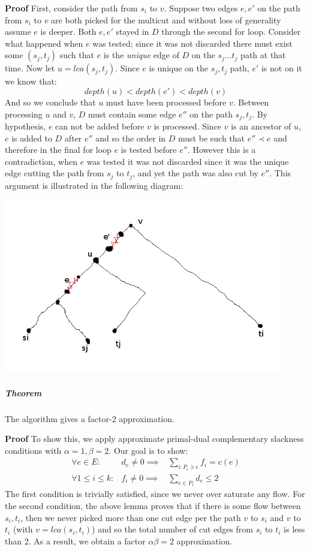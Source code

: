 \documentclass{article}
\begin{document}
\textbf{Proof} First, consider the path from $s_i$ to $v$.  Suppose two edges $e, e'$ on the path from $s_i$ to $v$ are both picked for the multicut and without loss of generality assume $e$ is deeper.  Both $e, e'$ stayed in $D$ through the second for loop.  Consider what happened when $e$ was tested; since it was not discarded there must exist some $(s_j, t_j)$ such that $e$ is the \emph{unique} edge of $D$ on the $s_j ... t_j$ path at that time.  Now let $u = lca(s_j, t_j)$.  Since $e$ is unique on the $s_j, t_j$ path, $e'$ is not on it we know that:
\[ depth(u) < depth(e') < depth(v) \]
And so we conclude that $u$ must have been processed before $v$.  Between processing $u$ and $v$, $D$ must contain some edge $e''$ on the path $s_j, t_j$.  By hypothesis, $e$ can not be added before $v$ is processed.  Since $v$ is an ancestor of $u$, $e$ is added to $D$ after $e''$ and so the order in $D$ must be such that $e'' \prec e$ and therefore in the final for loop $e$ is tested before $e''$.  However this is a contradiction, when $e$ was tested it was not discarded since it was the unique edge cutting the path from $s_j$ to $t_j$, and yet the path was also cut by $e''$.  This argument is illustrated in the following diagram:

\begin{center}
\includegraphics[height=3in]{picture.png}
\end{center}

\subparagraph{Theorem} The algorithm gives a factor-2 approximation.

\textbf{Proof} To show this, we apply approximate primal-dual complementary slackness conditions with $\alpha = 1, \beta = 2$.  Our goal is to show:
\begin{eqnarray*}
\forall e \in E : & d_e \neq 0 \implies & \sum \limits_{i : P_i \ni e} f_i = c(e) \\
\forall 1 \leq i \leq k : &  f_i \neq 0 \implies & \sum \limits_{e \in P_i} d_e \leq 2
\end{eqnarray*}
The first condition is trivially satisfied, since we never over saturate any flow.  For the second condition, the above lemma proves that if there is some flow between $s_i, t_i$, then we never picked more than one cut edge per the path $v$ to $s_i$ and $v$ to $t_i$ (with $v = lca(s_i, t_i)$) and so the total number of cut edges from $s_i$ to $t_i$ is less than 2.  As a result, we obtain a factor $\alpha \beta = 2$ approximation.
\end{document}
